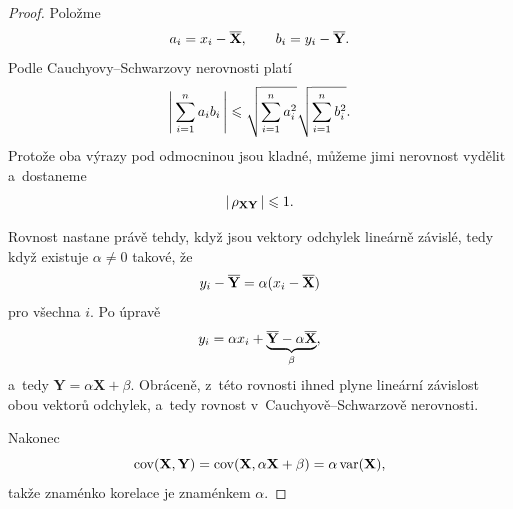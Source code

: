 \begin{proof}
    Položme
    \[
        a_i=x_i-\overline{\mathbf{X}},
        \qquad
        b_i=y_i-\overline{\mathbf{Y}}.
    \]
    Podle Cauchyovy--Schwarzovy nerovnosti platí
    \[
        \left|\,\sum_{i=1}^{n}a_ib_i\,\right|
        \leqslant
        \sqrt{\sum_{i=1}^{n}a_i^2}
        \sqrt{\sum_{i=1}^{n}b_i^2}.
    \]
    Protože oba výrazy pod odmocninou jsou kladné, můžeme jimi nerovnost vydělit a~dostaneme
    \[
        \left|\,\rho_{\mathbf{X}\mathbf{Y}}\,\right|\leqslant1.
    \]

    Rovnost nastane právě tehdy, když jsou vektory odchylek lineárně závislé, tedy když existuje \(\alpha\neq0\) takové, že
    \[
        y_i-\overline{\mathbf{Y}}
        =
        \alpha(x_i-\overline{\mathbf{X}})
    \]
    pro všechna \(i\). Po úpravě
    \[
        y_i
        =
        \alpha x_i+
        \underbrace{
            \overline{\mathbf{Y}}
            -\alpha\overline{\mathbf{X}}
        }_{\beta},
    \]
    a~tedy \(\mathbf{Y}=\alpha\mathbf{X}+\beta\).
    Obráceně, z~této rovnosti ihned plyne lineární závislost obou vektorů odchylek, a~tedy rovnost v~Cauchyově--Schwarzově nerovnosti.

    Nakonec
    \[
        \operatorname{cov}(\mathbf{X},\mathbf{Y})
        =
        \operatorname{cov}(\mathbf{X},\alpha\mathbf{X}+\beta)
        =
        \alpha\operatorname{var}(\mathbf{X}),
    \]
    takže znaménko korelace je znaménkem \(\alpha\).
\end{proof}

